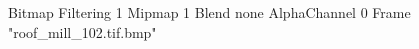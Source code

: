 {Bitmap
	{Filtering 1}
	{Mipmap 1}
	{Blend none}
	{AlphaChannel 0}
	{Frame "roof_mill_102.tif.bmp"}
}
